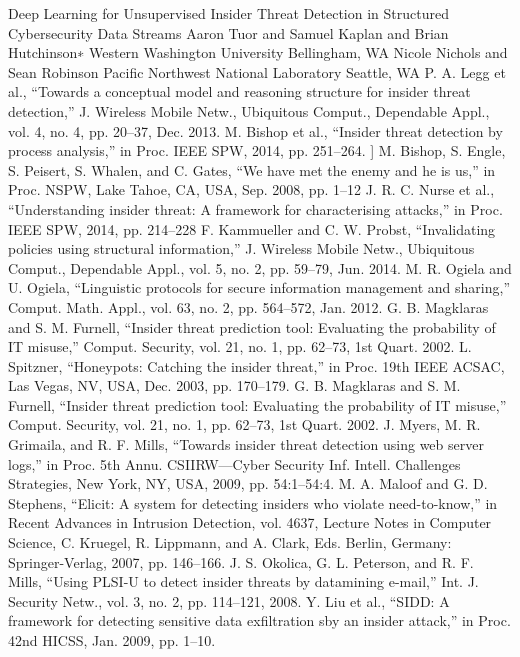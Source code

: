 \documentclass[conference]{IEEEtran}
\begin{document}
\begin{thebibliography}{00}
  Deep Learning for Unsupervised Insider Threat Detection in Structured Cybersecurity Data Streams Aaron Tuor and Samuel Kaplan and Brian Hutchinson∗
Western Washington University Bellingham, WA Nicole Nichols and Sean Robinson Pacific Northwest National Laboratory Seattle, WA
  P. A. Legg et al., “Towards a conceptual model and reasoning structure for insider threat detection,” J. Wireless Mobile Netw., Ubiquitous Comput., Dependable Appl., vol. 4, no. 4, pp. 20–37, Dec. 2013.
 M. Bishop et al., “Insider threat detection by process analysis,” in Proc. IEEE SPW, 2014, pp. 251–264.
] M. Bishop, S. Engle, S. Peisert, S. Whalen, and C. Gates, “We have met the enemy and he is us,” in Proc. NSPW, Lake Tahoe, CA, USA, Sep. 2008, pp. 1–12
 J. R. C. Nurse et al., “Understanding insider threat: A framework for characterising attacks,” in Proc. IEEE SPW, 2014, pp. 214–228
F. Kammueller and C. W. Probst, “Invalidating policies using structural information,” J. Wireless Mobile Netw., Ubiquitous Comput., Dependable Appl., vol. 5, no. 2, pp. 59–79, Jun. 2014.
 M. R. Ogiela and U. Ogiela, “Linguistic protocols for secure information management and sharing,” Comput. Math. Appl., vol. 63, no. 2, pp. 564–572, Jan. 2012.
G. B. Magklaras and S. M. Furnell, “Insider threat prediction tool: Evaluating the probability of IT misuse,” Comput. Security, vol. 21, no. 1, pp. 62–73, 1st Quart. 2002.
 L. Spitzner, “Honeypots: Catching the insider threat,” in Proc. 19th IEEE ACSAC, Las Vegas, NV, USA, Dec. 2003, pp. 170–179.
G. B. Magklaras and S. M. Furnell, “Insider threat prediction tool: Evaluating the probability of IT misuse,” Comput. Security, vol. 21, no. 1, pp. 62–73, 1st Quart. 2002.
 J. Myers, M. R. Grimaila, and R. F. Mills, “Towards insider threat detection using web server logs,” in Proc. 5th Annu. CSIIRW—Cyber Security Inf. Intell. Challenges Strategies, New York, NY, USA, 2009, pp. 54:1–54:4.
 M. A. Maloof and G. D. Stephens, “Elicit: A system for detecting insiders who violate need-to-know,” in Recent Advances in Intrusion Detection, vol. 4637, Lecture Notes in Computer Science, C. Kruegel, R. Lippmann, and A. Clark, Eds. Berlin, Germany: Springer-Verlag, 2007, pp. 146–166.
 J. S. Okolica, G. L. Peterson, and R. F. Mills, “Using PLSI-U to detect insider threats by datamining e-mail,” Int. J. Security Netw., vol. 3, no. 2, pp. 114–121, 2008.
Y. Liu et al., “SIDD: A framework for detecting sensitive data exfiltration sby an insider attack,” in Proc. 42nd HICSS, Jan. 2009, pp. 1–10.

\end{thebibliography}
\end{document}

